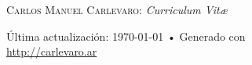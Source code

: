 \documentclass[10pt, a4paper]{article}
\begin{document}
% 
\thispagestyle{empty}
{\Large \textsc{Carlos Manuel Carlevaro}: \textit{Curriculum Vit{\ae}}}

\hrulefill













% 

\vspace{1cm}
\vfill{}
\begin{center}
{\scriptsize  Última actualización: \today\- •\- 
Generado con \href{http://es.wikipedia.org/wiki/XeLaTeX}{
\XeTeX }\\
\href{http://carlevaro.ar}{http://carlevaro.ar}}
\end{center}
\end{document}

